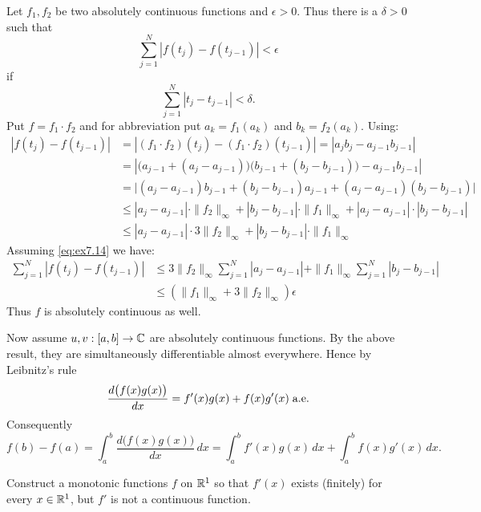 \begin{enumerate}
Let \(f_1,f_2\) be two absolutely continuous functions and \(\epsilon>0\).
Thus there is a \(\delta>0\) such that 
\begin{equation*}
\sum_{j=1}^N |f(t_j) - f(t_{j-1})|<\epsilon
\end{equation*}
if 
\begin{equation} \label{eq:ex7.14}
\sum_{j=1}^N |t_j - t_{j-1}|<\delta.
\end{equation}
Put \(f = f_1\cdot f_2\) and 
for abbreviation put \(a_k = f_1(a_k)\) and \(b_k = f_2(a_k)\). 
Using:
\begin{align*}
|f(t_j) - f(t_{j-1})|
&= |(f_1\cdot f_2)(t_j) - (f_1\cdot f_2)(t_{j-1})|
 = |a_j b_j - a_{j-1}b_{j-1}| \\
&= \left|
    \bigl(a_{j-1} + (a_j - a_{j-1})\bigr)
    \bigl(b_{j-1} + (b_j - b_{j-1})\bigr) - a_{j-1}b_{j-1}
   \right| \\
&= \bigl|
      (a_j - a_{j-1})b_{j-1} 
    + (b_j - b_{j-1})a_{j-1} 
    + (a_j - a_{j-1}) (b_j - b_{j-1}) 
   \bigr| \\
&\leq 
    |a_j - a_{j-1}|\cdot \|f_2\|_\infty
    + |b_j - b_{j-1}|\cdot \|f_1\|_\infty
    + |a_j - a_{j-1}|\cdot |b_j - b_{j-1}| \\
&\leq 
    |a_j - a_{j-1}|\cdot 3\|f_2\|_\infty
    + |b_j - b_{j-1}|\cdot \|f_1\|_\infty
\end{align*}
Assuming \eqref{eq:ex7.14} we have:
\begin{align*}
\sum_{j=1}^N |f(t_j) - f(t_{j-1})|
&\leq
    3\|f_2\|_\infty \sum_{j=1}^N  |a_j - a_{j-1}|
  + \|f_1\|_\infty \sum_{j=1}^N  |b_j - b_{j-1}|  \\
&\leq \left(\|f_1\|_\infty + 3\|f_2\|_\infty \right) \epsilon
\end{align*}
Thus $f$ is absolutely continuous as well.

Now assume \(u,v: [a,b]\to\mathbb{C}\) are absolutely continuous functions.
By the above result, they are simultaneously differentiable almost everywhere.
Hence by Leibnitz's rule
\begin{equation*}
\frac{d\bigl(f(x)g(x)\bigr)}{dx} = f'(x)g(x) + f(x)g'(x) \; \textrm{a.e.}
\end{equation*}
Consequently
\begin{equation*}
f(b) - f(a) =
\int_a^b \frac{d\bigl(f(x)g(x)\bigr)}{dx}\,dx 
= \int_a^b f'(x)g(x)\,dx + \int_a^b f(x)g'(x)\,dx.
\end{equation*}



\begin{excopy}
Construct a monotonic functions $f$ on \(\mathbb{R}^1\) so that \(f'(x)\) exists
(finitely) for every \(x\in \mathbb{R}^1\), but \(f'\) is not a continuous function.
\end{excopy}


\end{enumerate}
